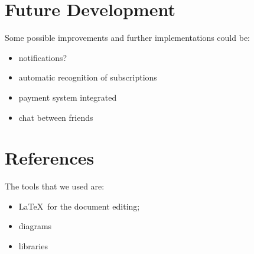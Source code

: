 \documentclass[11pt]{article}
\begin{document}
\newpage
\section{Future Development}\label{sec:dev}
Some possible improvements and further implementations could be:
\begin{itemize}
    \item notifications?
    \item automatic recognition of subscriptions
    \item payment system integrated
    \item chat between friends
\end{itemize}

\section{References}\label{sec:ref}
The tools that we used are:
\begin{itemize}
    \item \LaTeX\ for the document editing;
    \item diagrams
    \item libraries
\end{itemize}
\end{document}
